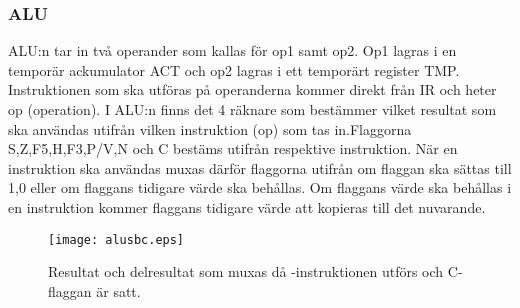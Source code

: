 \documentclass[main.tex]{subfiles}
\begin{document}
\newpage
\subsubsection{ALU}
ALU:n tar in två operander som kallas för op1 samt op2. Op1 lagras i en
temporär ackumulator ACT och op2 lagras i ett temporärt register TMP.
Instruktionen som ska utföras på operanderna kommer direkt från IR och heter op
(operation). I ALU:n finns det 4 räknare som bestämmer vilket resultat som ska
användas utifrån vilken instruktion (op) som tas in.Flaggorna S,Z,F5,H,F3,P/V,N
och C bestäms utifrån respektive instruktion. När en instruktion ska användas
muxas därför flaggorna utifrån om flaggan ska sättas till 1,0 eller om flaggans
tidigare värde ska behållas. Om flaggans värde ska behållas i en instruktion
kommer flaggans tidigare värde att kopieras till det nuvarande.

\begin{figure}[H]
    \center
    \texttt{[image: alusbc.eps]}
    \caption{Resultat och delresultat som muxas då -instruktionen
    utförs och C-flaggan är satt.}
\end{figure}
\end{document}
